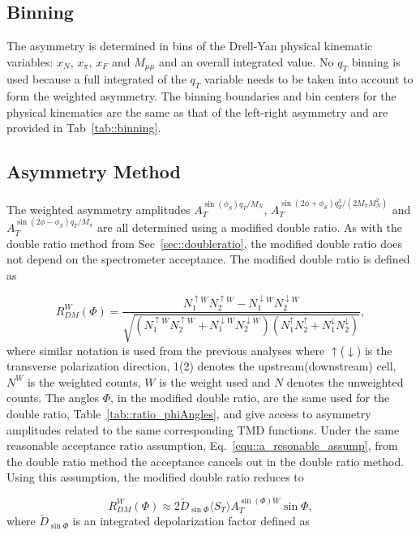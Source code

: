 \subsection{Binning}
The asymmetry is determined in bins of the Drell-Yan physical kinematic
variables: $x_N$, $x_\pi$, $x_F$ and $M_{\mu\mu}$ and an overall integrated
value.  No $q_T$ binning is used because a full integrated of the $q_T$ variable
needs to be taken into account to form the weighted asymmetry.  The binning
boundaries and bin centers for the physical kinematics are the same as that of
the left-right asymmetry and are provided in Tab~\ref{tab::binning}.

\subsection{Asymmetry Method}
The weighted asymmetry amplitudes $A_T^{\sin(\phi_S) q_T/M_N}$,
$A_T^{\sin(2\phi+\phi_S) q^3_T/(2M_{\pi}M_N^2)}$ and $A_T^{\sin(2\phi-\phi_S)
  q_T/M_{\pi}}$ are all determined using a modified double ratio.  As with the
double ratio method from Sec~\ref{sec::doubleratio}, the modified double ratio
does not depend on the spectrometer acceptance.  The modified double ratio is
defined as

\begin{equation}
  \label{equ::modified_dr}
  R^W_{DM}(\Phi)=
  \frac{N^{\uparrow W}_{1}N^{\uparrow W}_{2}
    - N^{\downarrow W}_{1}N^{\downarrow W}_{2}}
       {\sqrt{(N^{\uparrow W}_{1}N^{\uparrow W}_{2}
         + N^{\downarrow W}_{1}N^{\downarrow W}_{2})
         (N^{\uparrow}_{1}N^{\uparrow}_{2}
         + N^{\downarrow}_{1}N^{\downarrow}_{2})}},
\end{equation}
\noindent
where similar notation is used from the previous analyses where
$\uparrow$($\downarrow$) is the transverse polarization direction, 1(2) denotes
the upstream(downstream) cell, $N^{W}$ is the weighted counts, $W$ is the weight
used and $N$ denotes the unweighted counts.  The angles $\Phi$, in the modified
double ratio, are the same used for the double ratio,
Table~\ref{tab::ratio_phiAngles}, and give access to asymmetry amplitudes
related to the same corresponding TMD functions.  Under the same reasonable
acceptance ratio assumption, Eq.~\ref{equ::a_resonable_assump}, from the double
ratio method the acceptance cancels out in the double ratio method.  Using this
assumption, the modified double ratio reduces to

\begin{equation}
  \label{equ::dr_fit_form}
  R^W_{DM}(\Phi) \approx 2 \tilde{D}_{\sin\Phi}\langle S_T \rangle
  A_T^{\sin(\Phi)W} \sin\Phi,
\end{equation}
\noindent
where $\tilde{D}_{\sin\Phi}$ is an integrated depolarization factor defined as

